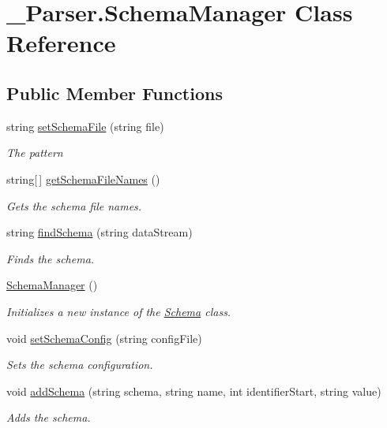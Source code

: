 \hypertarget{class__1920_parser_1_1_schema_manager}{}\section{\+\_\+Parser.\+Schema\+Manager Class Reference}
\label{class__1920_parser_1_1_schema_manager}
\subsection*{Public Member Functions}
\begin{DoxyCompactItemize}
\item 
string \hyperlink{class__1920_parser_1_1_schema_manager_a0774b7dca8df12f858488805971bfe79}{set\+Schema\+File} (string file)
\begin{DoxyCompactList}\small\item\em The pattern \end{DoxyCompactList}\item 
string\mbox{[}$\,$\mbox{]} \hyperlink{class__1920_parser_1_1_schema_manager_a43e203435b5c2da0038c133f549d5636}{get\+Schema\+File\+Names} ()
\begin{DoxyCompactList}\small\item\em Gets the schema file names. \end{DoxyCompactList}\item 
string \hyperlink{class__1920_parser_1_1_schema_manager_a76e47dcd134506a1f138c1f0b29ad9b7}{find\+Schema} (string data\+Stream)
\begin{DoxyCompactList}\small\item\em Finds the schema. \end{DoxyCompactList}\item 
\hyperlink{class__1920_parser_1_1_schema_manager_ad066400816c7b491d9b3a86a45760a75}{Schema\+Manager} ()
\begin{DoxyCompactList}\small\item\em Initializes a new instance of the \hyperlink{class__1920_parser_1_1_schema}{Schema} class. \end{DoxyCompactList}\item 
void \hyperlink{class__1920_parser_1_1_schema_manager_abeedec8ec656ba98a3b6a48f048e9fb1}{set\+Schema\+Config} (string config\+File)
\begin{DoxyCompactList}\small\item\em Sets the schema configuration. \end{DoxyCompactList}\item 
void \hyperlink{class__1920_parser_1_1_schema_manager_ad8097dd78df7a2f2bd6a6eba950b2df2}{add\+Schema} (string schema, string name, int identifier\+Start, string value)
\begin{DoxyCompactList}\small\item\em Adds the schema. \end{DoxyCompactList}\end{DoxyCompactItemize}


